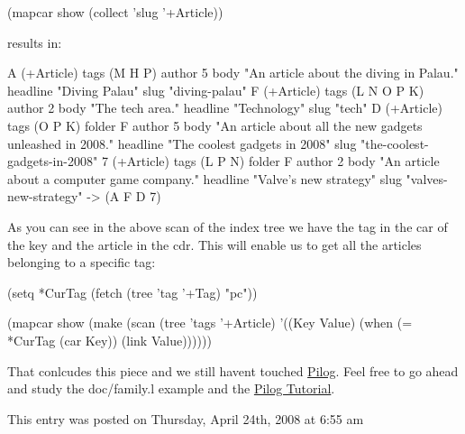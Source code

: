 \begin{wideverbatim}
(mapcar show (collect 'slug '+Article))
\end{wideverbatim}

results in:


\begin{wideverbatim}
{A} (+Article)
   tags ({M} {H} {P})
   author {5}
   body "An article about the diving in Palau."
   headline "Diving Palau"
   slug "diving-palau"
{F} (+Article)
   tags ({L} {N} {O} {P} {K})
   author {2}
   body "The tech area."
   headline "Technology"
   slug "tech"
{D} (+Article)
   tags ({O} {P} {K})
   folder {F}
   author {5}
   body "An article about all the new gadgets unleashed in 2008."
   headline "The coolest gadgets in 2008"
   slug "the-coolest-gadgets-in-2008"
{7} (+Article)
   tags ({L} {P} {N})
   folder {F}
   author {2}
   body "An article about a computer game company."
   headline "Valve's new strategy"
   slug "valves-new-strategy"
-> ({A} {F} {D} {7})
\end{wideverbatim}

As you can see in the above scan of the index tree we have the tag in
the car of the key and the article in the cdr. This will enable us to
get all the articles belonging to a specific tag:


\begin{wideverbatim}
(setq *CurTag (fetch (tree 'tag '+Tag) "pc"))

(mapcar show 
        (make 
         (scan 
          (tree 'tags '+Article) 
          '((Key Value)
            (when (= *CurTag (car Key)) (link Value))))))
\end{wideverbatim}

That conlcudes this piece and we still havent touched
\href{http://www.software-lab.de/ref.html#pilog}{Pilog}. Feel free to go
ahead and study the doc/family.l example and the
\href{http://www.software-lab.de/tut.html#pilog}{Pilog Tutorial}.

This entry was posted on Thursday, April 24th, 2008 at 6:55 am 



